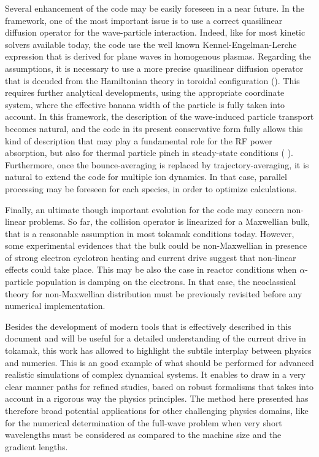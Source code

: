 Several enhancement of the code may be easily foreseen in a near future. In
the framework, one of the most important issue is to use a correct
quasilinear diffusion operator for the wave-particle interaction. Indeed,
like for most kinetic solvers available today, the code use the well known
Kennel-Engelman-Lerche expression that is derived for plane waves in
homogenous plasmas. Regarding the assumptions, it is necessary to use a more
precise quasilinear diffusion operator that is decuded from the Hamiltonian
theory in toroidal configuration (\cite{eri94}). This requires further
analytical developments, using the appropriate coordinate system, where the
effective banana width of the particle is fully taken into account. In this
framework, the description of the wave-induced particle transport becomes
natural, and the code in its present conservative form fully allows this
kind of description that may play a fundamental role for the RF power
absorption, but also for thermal particle pinch in steady-state conditions (%
\cite{hoa03}). Furthermore, once the bounce-averaging is replaced by
trajectory-averaging, it is natural to extend the code for multiple ion
dynamics. In that case, parallel processing may be foreseen for each
species, in order to optimize calculations.

Finally, an ultimate though important evolution for the code may concern
non-linear problems. So far, the collision operator is linearized for a
Maxwellian bulk, that is a reasonable assumption in most tokamak conditions
today. However, some experimental evidences that the bulk could be
non-Maxwellian in presence of strong electron cyclotron heating and current
drive suggest that non-linear effects could take place. This may be also the
case in reactor conditions when $\alpha $-particle population is damping on
the electrons. In that case, the neoclassical theory for non-Maxwellian
distribution must be previously revisited before any numerical
implementation.

Besides the development of modern tools that is effectively described in
this document and will be useful for a detailed understanding of the current
drive in tokamak, this work has allowed to highlight the subtile interplay
between physics and numerics. This is an good example of what should be
performed for advanced realistic simulations of complex dynamical systems.
It enables to draw in a very clear manner paths for refined studies, based
on robust formalisms that takes into account in a rigorous way the physics
principles. The method here presented has therefore broad potential
applications for other challenging physics domains, like for the numerical
determination of the full-wave problem when very short wavelengths must be
considered as compared to the machine size and the gradient lengths.
